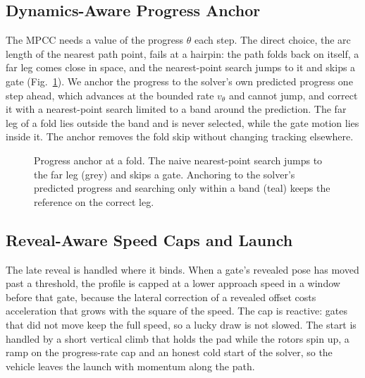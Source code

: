 \documentclass[conference]{IEEEtran}
\begin{document}
\subsection{Dynamics-Aware Progress Anchor}
\label{sec:anchor}
The MPCC needs a value of the progress $\theta$ each step. The direct choice, the arc length of the nearest path point, fails at a hairpin: the path folds back on itself, a far leg comes close in space, and the nearest-point search jumps to it and skips a gate (Fig.~\ref{fig:anchor}). We anchor the progress to the solver's own predicted progress one step ahead, which advances at the bounded rate $v_\theta$ and cannot jump, and correct it with a nearest-point search limited to a band around the prediction. The far leg of a fold lies outside the band and is never selected, while the gate motion lies inside it. The anchor removes the fold skip without changing tracking elsewhere.

\begin{figure}[t]
\centering
{}
\caption{Progress anchor at a fold. The naive nearest-point search jumps to the far leg (grey) and skips a gate. Anchoring to the solver's predicted progress and searching only within a band (teal) keeps the reference on the correct leg.}
\label{fig:anchor}
\end{figure}

\subsection{Reveal-Aware Speed Caps and Launch}
\label{sec:caps}
The late reveal is handled where it binds. When a gate's revealed pose has moved past a threshold, the profile is capped at a lower approach speed in a window before that gate, because the lateral correction of a revealed offset costs acceleration that grows with the square of the speed. The cap is reactive: gates that did not move keep the full speed, so a lucky draw is not slowed. The start is handled by a short vertical climb that holds the pad while the rotors spin up, a ramp on the progress-rate cap and an honest cold start of the solver, so the vehicle leaves the launch with momentum along the path.
\end{document}
